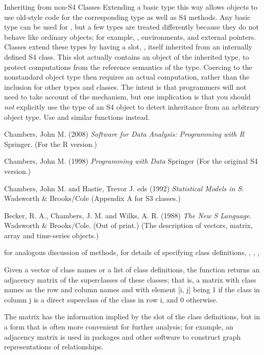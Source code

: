 \begin{Section}{Inheriting from non-S4 Classes}
Extending a basic type this way allows objects to
use old-style code for the corresponding type as well as S4
methods.  Any basic type can be used for , but
a few types are treated differently because they do not behave like ordinary objects;
for example, , environments, and external pointers.
Classes extend these types by having a slot, ,
itself inherited from an internally defined S4 class.  This
slot actually contains an object of the inherited type, to
protect computations from the reference semantics of the type.
Coercing to the nonstandard object type then requires an
actual computation, rather than the  inclusion
for other types and classes.  The intent is that programmers
will not need to take account of the mechanism, but one
implication is that you should \emph{not} explicitly use the
type of an S4 object to detect inheritance from an arbitrary
object type.  Use
 and similar functions instead.
\end{Section}
%
\begin{References}\relax
Chambers, John M. (2008)
\emph{Software for Data Analysis: Programming with R}
Springer.  (For the R version.)

Chambers, John M. (1998)
\emph{Programming with Data}
Springer (For the original S4 version.)

Chambers, John M.  and Hastie, Trevor  J. eds (1992)
\emph{Statistical Models in S.}
Wadsworth \& Brooks/Cole (Appendix A for S3 classes.)

Becker, R. A., Chambers, J. M. and Wilks, A. R. (1988)
\emph{The New S Language}.
Wadsworth \& Brooks/Cole. (Out of print.) (The description of
vectors, matrix, array and time-series objects.)
\end{References}
%
\begin{SeeAlso}\relax
{} for analogous discussion of methods,
 for details of specifying class definitions,
,
,
,
\end{SeeAlso}
%
\begin{Description}\relax
Given a vector of class names or a list of class definitions, the
function returns an adjacency matrix of the superclasses of these
classes; that is, a matrix with class names as the row and column
names and with element [i, j] being 1 if the class in column j is a
direct superclass of the class in row i, and 0 otherwise.

The matrix has the information implied by the  slot of
the class definitions, but in a form that is often more convenient for
further analysis; for example, an adjacency matrix is used in packages
and other software to construct graph representations of relationships.
\end{Description}
